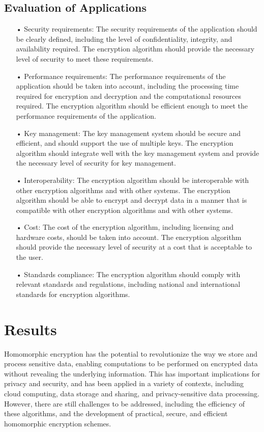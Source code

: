\documentclass[conference]{IEEEtran}
\begin{document}
\subsection{Evaluation of Applications}
\begin{itemize}
\item[•] Security requirements: The security requirements of the application should be clearly defined, including the level of confidentiality, integrity, and availability required. The encryption algorithm should provide the necessary level of security to meet these requirements.

\item[•] Performance requirements: The performance requirements of the application should be taken into account, including the processing time required for encryption and decryption and the computational resources required. The encryption algorithm should be efficient enough to meet the performance requirements of the application.

\item[•] Key management: The key management system should be secure and efficient, and should support the use of multiple keys. The encryption algorithm should integrate well with the key management system and provide the necessary level of security for key management.

\item[•] Interoperability: The encryption algorithm should be interoperable with other encryption algorithms and with other systems. The encryption algorithm should be able to encrypt and decrypt data in a manner that is compatible with other encryption algorithms and with other systems.

\item[•] Cost: The cost of the encryption algorithm, including licensing and hardware costs, should be taken into account. The encryption algorithm should provide the necessary level of security at a cost that is acceptable to the user.

\item[•] Standards compliance: The encryption algorithm should comply with relevant standards and regulations, including national and international standards for encryption algorithms.
\end{itemize}
\section{Results}
Homomorphic encryption has the potential to revolutionize the way we store and process sensitive data, enabling computations to be performed on encrypted data without revealing the underlying information. This has important implications for privacy and security, and has been applied in a variety of contexts, including cloud computing, data storage and sharing, and privacy-sensitive data processing. However, there are still challenges to be addressed, including the efficiency of these algorithms, and the development of practical, secure, and efficient homomorphic encryption schemes.
\end{document}
